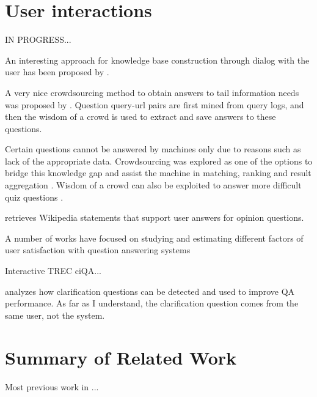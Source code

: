 \section{User interactions}

IN PROGRESS...

An interesting approach for knowledge base construction through dialog with the user has been proposed by \cite{hixon2015learning}.

A very nice crowdsourcing method to obtain answers to tail information needs was proposed by \cite{bernstein2012direct}.
Question query-url pairs are first mined from query logs, and then the wisdom of a crowd is used to extract and save answers to these questions.

Certain questions cannot be answered by machines only due to reasons such as lack of the appropriate data.
Crowdsourcing was explored as one of the options to bridge this knowledge gap and assist the machine in matching, ranking and result aggregation \cite{Franklin:2011:CAQ:1989323.1989331}.
Wisdom of a crowd can also be exploited to answer more difficult quiz questions \cite{aydin2014crowdsourcing}.

\cite{braunstain2016supporting} retrieves Wikipedia statements that support user answers for opinion questions.

A number of works have focused on studying and estimating different factors of user satisfaction with question answering systems \cite{ong2009measurement,Liu:2008:PIS:1390334.1390417}

Interactive TREC ciQA...

\cite{de2003analysis} analyzes how clarification questions can be detected and used to improve QA performance. As far as I understand, the clarification question comes from the same user, not the system.

\section{Summary of Related Work}

Most previous work in ...

\clearpage